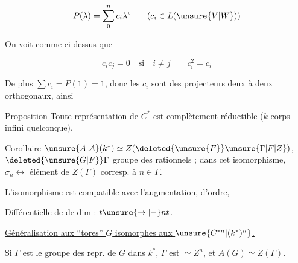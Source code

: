 
\[P(\lambda)=\sum_0^n c_i\lambda^i\qquad(c_i\in L(\unsure{V|W}))\]

On voit comme ci-dessus que

\[c_i c_j=0\quad\text{si}\quad i\ne j\qquad c_i^2=c_i\]

De plus $\sum c_i=P(1)=1$, donc les $c_i$ sont des projecteurs deux à deux orthogonaux, ainsi

\uline{Proposition} Toute représentation  de $C^*$ est complètement réductible ($k$ corps infini quelconque).

\uline{Corollaire} $\unsure{A|\mathcal A}(k^*)\simeq Z(\deleted{\unsure{F}}\unsure{\Gamma|F|Z})$, $\deleted{\unsure{G|F}}\Gamma$ groupe des  rationnels ; dans cet isomorphisme, $\sigma_n\longleftrightarrow$ élément de $Z(\Gamma)$ corresp.  à $n\in\Gamma$.

L'isomorphisme est compatible avec l'augmentation,  d'ordre, 

Différentielle de  de dim  : $t\unsure{\to|-}nt$.

\uline{Généralisation aux ``tores'' $G$ isomorphes aux $\unsure{C^{*n}|(k^*)^n}$.}

Si $\Gamma$ est le groupe des repr.  de $G$ dans $k^*$, $\Gamma$ est $\simeq Z^n$, et $A(G)\simeq Z(\Gamma)$.

